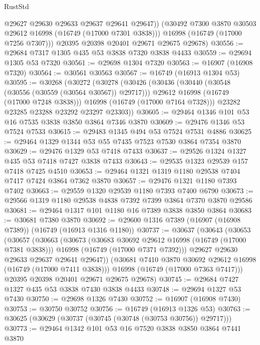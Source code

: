 \begin{lexlean}{RustStd}
\begin{coremodule}
            @29627
            @29630
            @29633
            @29637
            @29641
            @29647))
        (@30492 @7300 @3870 @30503 @29612 @16998 (@16749 (@17000 @7301 @3838)))
        @16998
        (@16749 (@17000 @7256 @7307)))
      @20395
      @20398
      @20401
      @29671
      @29675
      @29678)
@30556 := @29684 @7317 @1305 @435 @53 @3838 @7320 @3838 @4433
@30559 := @29694 @1305 @53 @7320
@30561 := @29698 @1304 @7320
@30563 := @16907 (@16908 @7320)
@30564 := @30561 @30563
@30567 := @16749 (@16913 @1304 @53)
@30595 := @30268
    (@30272
      (@30278
        (@30426
          (@30436
            (@30440 (@30548 (@30556 (@30559 (@30564 @30567)) @29717)))
            @29612
            @16998
            (@16749 (@17000 @7248 @3838)))
          @16998
          (@16749 (@17000 @7164 @7328)))
        @23282
        @23285
        @23288
        @23292
        @23297
        @23303))
@30605 := @29464 @1346 @101 @53 @16 @7535 @3838 @3850 @3864 @7346 @3870
@30609 := @29476 @1346 @53 @7524 @7533
@30615 := @29483 @1345 @494 @53 @7524 @7531 @4886
@30625 := @29464 @1329 @1344 @53 @55 @7435 @7523 @7530 @3864 @7354 @3870
@30629 := @29476 @1329 @53 @7418 @7433
@30637 := @29526 @1324 @1327 @435 @53 @7418 @7427 @3838 @7433
@30643 := @29535 @1323 @29539 @157 @7418 @7425 @4510
@30653 := @29464 @1321 @1319 @1180 @29538 @7404 @7417 @7424 @3864 @7362 @3870
@30657 := @29476 @1321 @1180 @7393 @7402
@30663 := @29559 @1320 @29539 @1180 @7393 @7400 @6790
@30673 := @29566 @1319 @1180 @29538 @4838 @7392 @7399 @3864 @7370 @3870 @29586
@30681 := @29464 @1317 @101 @1180 @16 @7389 @3838 @3850 @3864
@30683 := @30681 @7380 @3870
@30692 := @29600 @1316 @7389 (@16907 (@16908 @7389)) (@16749 (@16913 @1316 @1180))
@30737 := @30637
    (@30643
      (@30653
        (@30657
          (@30663
            (@30673
              (@30683 @30692 @29612 @16998 (@16749 (@17000 @7381 @3838)))
              @16998
              (@16749 (@17000 @7371 @7392)))
            @29627
            @29630
            @29633
            @29637
            @29641
            @29647))
        (@30681 @7410 @3870 @30692 @29612 @16998 (@16749 (@17000 @7411 @3838)))
        @16998
        (@16749 (@17000 @7363 @7417)))
      @20395
      @20398
      @20401
      @29671
      @29675
      @29678)
@30745 := @29684 @7427 @1327 @435 @53 @3838 @7430 @3838 @4433
@30748 := @29694 @1327 @53 @7430
@30750 := @29698 @1326 @7430
@30752 := @16907 (@16908 @7430)
@30753 := @30750 @30752
@30756 := @16749 (@16913 @1326 @53)
@30763 := @30625 (@30629 (@30737 (@30745 (@30748 (@30753 @30756)) @29717)))
@30773 := @29464 @1342 @101 @53 @16 @7520 @3838 @3850 @3864 @7441 @3870

\end{coremodule}
\end{lexlean}
